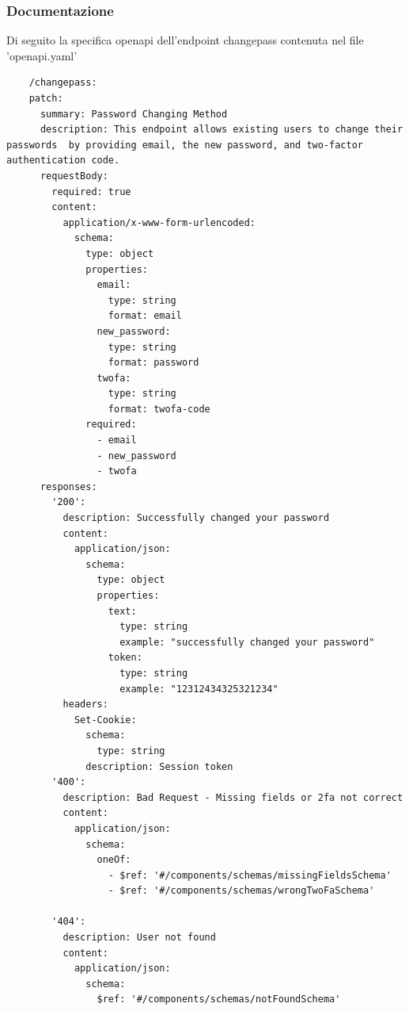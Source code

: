 \documentclass{report}
\begin{document}
\subsubsection*{Documentazione}
Di seguito la specifica openapi dell'endpoint changepass contenuta nel file 'openapi.yaml'
\begin{verbatim}
	/changepass:
    patch:
      summary: Password Changing Method
      description: This endpoint allows existing users to change their passwords  by providing email, the new password, and two-factor authentication code.
      requestBody:
        required: true
        content:
          application/x-www-form-urlencoded:
            schema:
              type: object
              properties:
                email:
                  type: string
                  format: email
                new_password:
                  type: string
                  format: password
                twofa:
                  type: string
                  format: twofa-code
              required:
                - email
                - new_password
                - twofa
      responses:
        '200':
          description: Successfully changed your password
          content:
            application/json:
              schema:
                type: object
                properties:
                  text:
                    type: string
                    example: "successfully changed your password"
                  token:
                    type: string
                    example: "12312434325321234"
          headers:
            Set-Cookie:
              schema:
                type: string
              description: Session token
        '400':
          description: Bad Request - Missing fields or 2fa not correct
          content:
            application/json:
              schema:
                oneOf:
                  - $ref: '#/components/schemas/missingFieldsSchema'
                  - $ref: '#/components/schemas/wrongTwoFaSchema'
      
        '404':
          description: User not found
          content:
            application/json:
              schema:
                $ref: '#/components/schemas/notFoundSchema'

\end{verbatim}
\end{document}
